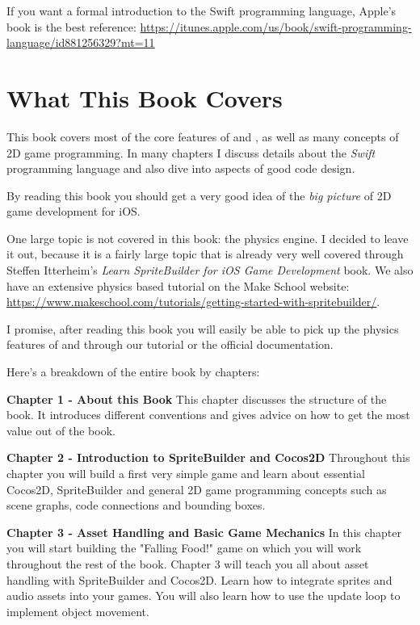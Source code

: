 If you want a formal introduction to the Swift programming language, Apple's
book is the best reference:
\url{https://itunes.apple.com/us/book/swift-programming-language/id881256329?mt=11}

\section{What This Book Covers}
This book covers most of the core features of \SB{} and \cocos{}, as well as
many concepts of 2D game programming. In many chapters I discuss details about
the \textit{Swift} programming language and also dive into aspects of good code
design. 

By reading this book you should get a very good idea of the \textit{big picture}
of 2D game development for iOS.

One large topic is not covered in this book: the \cocos{} physics engine. I
decided to leave it out, because it is a fairly large topic that is already very
well covered through Steffen Itterheim's \textit{Learn SpriteBuilder for iOS
Game Development} book. We also have an extensive physics based tutorial on the
Make School website:
\url{https://www.makeschool.com/tutorials/getting-started-with-spritebuilder/}.

I promise, after reading this book you will easily be able to pick up the
physics features of \SB{} and \cocos{} through our tutorial or the official
documentation.

Here's a breakdown of the entire book by chapters:

\textbf{Chapter 1 - About this Book}\newline
This chapter discusses the structure of the book. 
It introduces different conventions and gives advice on how to get the most value out of the book.


\textbf{Chapter 2 - Introduction to SpriteBuilder and Cocos2D}\newline
Throughout this chapter you will build a first very simple game and learn about essential Cocos2D, SpriteBuilder 
and general 2D game programming concepts such as scene graphs, code connections and bounding boxes.


\textbf{Chapter 3 - Asset Handling and Basic Game Mechanics}\newline
In this chapter you will start building the "Falling Food!" game on which you will work throughout the rest of the book. 
Chapter 3 will teach you all about asset handling with SpriteBuilder and Cocos2D. 
Learn how to integrate sprites and audio assets into your games. 
You will also learn how to use the update loop to implement object movement.


